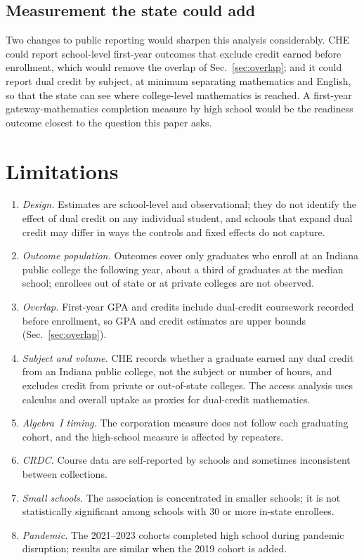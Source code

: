 \documentclass[aps,prd,reprint,superscriptaddress,nofootinbib,floatfix]{revtex4-2}
\begin{document}
\subsection{Measurement the state could add}

Two changes to public reporting would sharpen this analysis considerably. CHE could report school-level first-year outcomes that exclude credit earned before enrollment, which would remove the overlap of Sec.~\ref{sec:overlap}; and it could report dual credit by subject, at minimum separating mathematics and English, so that the state can see where college-level mathematics is reached. A first-year gateway-mathematics completion measure by high school would be the readiness outcome closest to the question this paper asks.

\section{Limitations}\label{sec:limitations}

\begin{enumerate}
\item \emph{Design.} Estimates are school-level and observational; they do not identify the effect of dual credit on any individual student, and schools that expand dual credit may differ in ways the controls and fixed effects do not capture.
\item \emph{Outcome population.} Outcomes cover only graduates who enroll at an Indiana public college the following year, about a third of graduates at the median school; enrollees out of state or at private colleges are not observed.
\item \emph{Overlap.} First-year GPA and credits include dual-credit coursework recorded before enrollment, so GPA and credit estimates are upper bounds (Sec.~\ref{sec:overlap}).
\item \emph{Subject and volume.} CHE records whether a graduate earned any dual credit from an Indiana public college, not the subject or number of hours, and excludes credit from private or out-of-state colleges. The access analysis uses calculus and overall uptake as proxies for dual-credit mathematics.
\item \emph{Algebra~I timing.} The corporation measure does not follow each graduating cohort, and the high-school measure is affected by repeaters.
\item \emph{CRDC.} Course data are self-reported by schools and sometimes inconsistent between collections.
\item \emph{Small schools.} The association is concentrated in smaller schools; it is not statistically significant among schools with 30 or more in-state enrollees.
\item \emph{Pandemic.} The 2021--2023 cohorts completed high school during pandemic disruption; results are similar when the 2019 cohort is added.
\end{enumerate}
\end{document}
